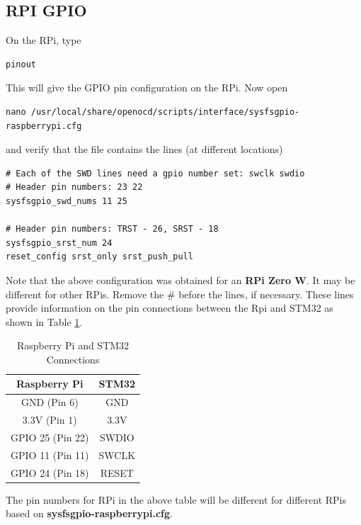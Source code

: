 \documentclass[journal,12pt,twocolumn]{IEEEtran}
\begin{document}
\subsection{RPI  GPIO}
On the RPi, type
\begin{lstlisting}
pinout
\end{lstlisting}
%
This will give the GPIO pin configuration on the RPi. Now open
\begin{lstlisting}
nano /usr/local/share/openocd/scripts/interface/sysfsgpio-raspberrypi.cfg
\end{lstlisting}
%
and verify that the file contains the lines (at different locations)
\begin{lstlisting}
# Each of the SWD lines need a gpio number set: swclk swdio
# Header pin numbers: 23 22
sysfsgpio_swd_nums 11 25

# Header pin numbers: TRST - 26, SRST - 18
sysfsgpio_srst_num 24
reset_config srst_only srst_push_pull
\end{lstlisting}
%
Note that the above configuration was obtained for an \textbf{RPi Zero W}. It may be different for other RPis.  Remove the \# before the  lines, if necessary.  These lines provide information on the pin connections between the Rpi and STM32 as shown in Table \ref{table:raspstm}.
\begin{table}[!h]
\centering
\begin{tabular}{|c|c|}
\hline
\textbf{Raspberry Pi} & \textbf{STM32} \\ \hline
GND (Pin 6)           & GND            \\ \hline
3.3V (Pin 1)          & 3.3V           \\ \hline
GPIO 25 (Pin 22)               & SWDIO           \\ \hline
GPIO 11 (Pin 11)               & SWCLK           \\ \hline
GPIO 24 (Pin 18)               & RESET          \\ \hline
\end{tabular}%
%
\caption{Raspberry Pi and STM32 Connections}
\label{table:raspstm}
\end{table}
The pin numbers for RPi in the above table will be different for different RPis based on \textbf{sysfsgpio-raspberrypi.cfg}.
\end{document}
